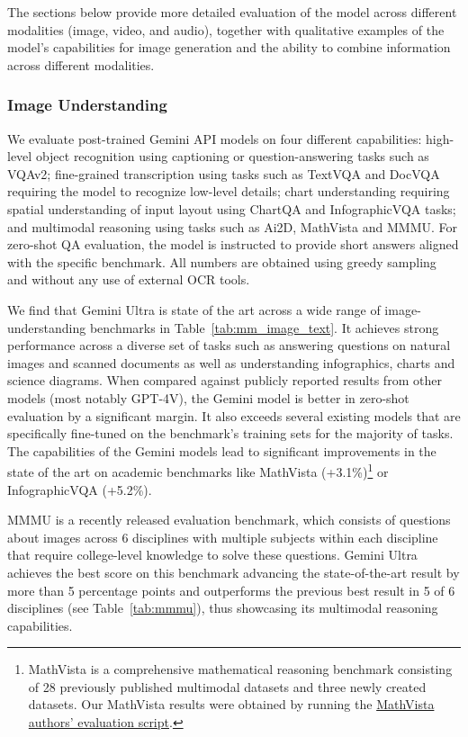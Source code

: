 The sections below provide more detailed evaluation of the model across different modalities (image, video, and audio), together with qualitative examples of the model's capabilities for image generation and the ability to combine information across different modalities. 

\subsubsection{Image Understanding}
\label{sec:image}
We evaluate post-trained Gemini API models on four different capabilities: high-level object recognition using captioning or question-answering tasks such as VQAv2; fine-grained transcription using tasks such as TextVQA and DocVQA requiring the model to recognize low-level details; chart understanding requiring spatial understanding of input layout using ChartQA and InfographicVQA tasks; and multimodal reasoning using tasks such as Ai2D, MathVista and MMMU. For zero-shot QA evaluation, the model is instructed to provide short answers aligned with the specific benchmark. All numbers are obtained using greedy sampling and without any use of external OCR tools. 


We find that Gemini Ultra is state of the art across a wide range of image-understanding benchmarks in Table~\ref{tab:mm_image_text}. It achieves strong performance across a diverse set of tasks such as answering questions on natural images and scanned documents as well as understanding infographics, charts and science diagrams. When compared against publicly reported results from other models (most notably GPT-4V), the Gemini model is better in zero-shot evaluation by a significant margin. It also exceeds several existing models that are specifically fine-tuned on the benchmark's training sets for the majority of tasks. The capabilities of the Gemini models lead to significant improvements in the state of the art on academic benchmarks like MathVista (+3.1\%)\footnote{MathVista is a comprehensive mathematical reasoning benchmark consisting of 28 previously published multimodal datasets and three newly created datasets. Our MathVista results were obtained by running the \href{https://github.com/lupantech/MathVista/tree/main/evaluation}{MathVista authors’ evaluation script}.} or InfographicVQA (+5.2\%). 

MMMU \citep{mmmu} is a recently released evaluation benchmark, which consists of questions about images across 6 disciplines with multiple subjects within each discipline that require college-level knowledge to solve these questions. Gemini Ultra achieves the best score on this benchmark advancing the state-of-the-art result by more than 5 percentage points and outperforms the previous best result in 5 of 6 disciplines (see Table~\ref{tab:mmmu}), thus showcasing its multimodal reasoning capabilities. 


